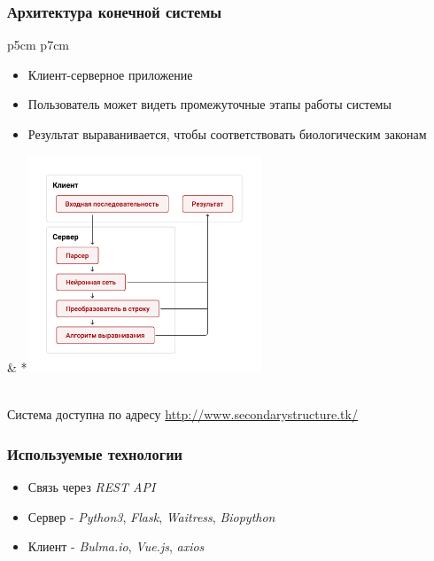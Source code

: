 \documentclass{beamer}
\begin{document}
\begin{frame}[fragile]
\transwipe[direction=90]
\frametitle{Архитектура конечной системы}
\begin{tabular}{p{5cm} p{7cm}}
	\begin{itemize}
		\item Клиент-серверное приложение
		\item Пользователь может видеть промежуточные этапы работы системы
		\item Результат выраванивается, чтобы соответствовать биологическим законам
		
		
	\end{itemize} &
	*{\!\includegraphics[width=7cm]{pictures/diag1.pdf}}
\end{tabular} \\ \bigskip 
Система доступна по адресу \url{http://www.secondarystructure.tk/}

\end{frame}

\begin{frame}
\transwipe[direction=90]
\frametitle{Используемые технологии}
\begin{itemize}
	\item Связь через \textit{REST API}
	\item Сервер - \textit{Python3}, \textit{Flask}, \textit{Waitress}, \textit{Biopython}
	\item Клиент - \textit{Bulma.io}, \textit{Vue.js}, \textit{axios}
	
\end{itemize}\medskip

\end{frame}
	
\end{document}
